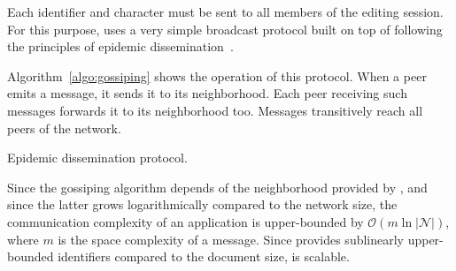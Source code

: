 Each identifier and character must be sent to all members of the editing
session. For this purpose, \CRATE uses a very simple broadcast protocol built on
top of \SPRAY following the principles of epidemic
dissemination~\cite{demers1987epidemic}.




Algorithm~\ref{algo:gossiping} shows the operation of this protocol. When a peer
emits a message, it sends it to its neighborhood. Each peer receiving such
messages forwards it to its neighborhood too. Messages transitively reach all
peers of the network.

\begin{algorithm}[h]
  
  \caption{\label{algo:gossiping}Epidemic dissemination protocol.}
\end{algorithm}

Since the gossiping algorithm depends of the neighborhood provided by \SPRAY,
and since the latter grows logarithmically compared to the network size, the
communication complexity of an application is upper-bounded by
$\mathcal{O}(m \ln |\mathcal{N}|)$, where $m$ is the space complexity of a
message. Since \LSEQ provides sublinearly upper-bounded identifiers compared to
the document size, \CRATE is scalable.

